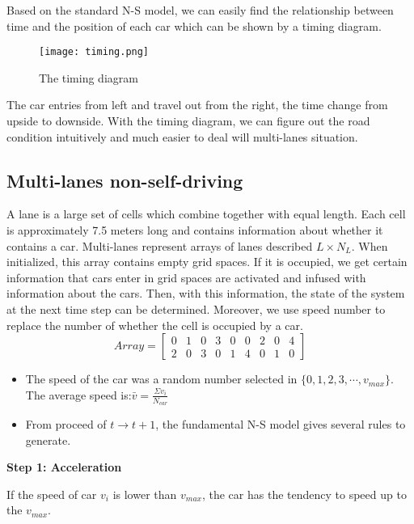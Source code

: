 \documentclass{mcmthesis}
\numberwithin{equation}{section}
\newcommand{\scite}[1]{\textsuperscript{\cite{#1}}}%
\begin{document}
			Based on the standard N-S model, we can easily find the relationship between time and the position of each car which can be shown by a timing diagram.
			\begin{figure}[H]
				\begin{center}
					\texttt{[image: timing.png]}
					\caption{The timing diagram}
				\end{center}
			\end{figure}

			The car entries from left and travel out from the right, the time change from upside to downside. With the timing diagram, we can figure out the road condition intuitively and much easier to deal will multi-lanes situation.
		\subsection{Multi-lanes non-self-driving}
			A lane is a large set of cells which combine together with equal length. Each cell is approximately 7.5 meters long and contains information about whether it contains a car. Multi-lanes represent arrays of lanes described $L \times N_{L}$. When initialized, this array contains empty grid spaces\scite{4}. If it is occupied, we get certain information that cars enter in grid spaces are activated and infused with information about the cars. Then, with this information, the state of the system at the next time step can be determined. Moreover, we use speed number to replace the number of whether the cell is occupied by a car.
			\begin{equation}
				Array=
				\begin{bmatrix}
					0&1&0&3&0&0&2&0&4\\
					2&0&3&0&1&4&0&1&0
				\end{bmatrix}
			\end{equation}
			\begin{itemize}
				\item The speed of the car was a random number selected in $\{0, 1, 2, 3, \cdots, v_{max}\}$.\\

				The average speed is:$\bar{v} = \frac{\Sigma v_{i}}{N_{car}}$
				\item From proceed of $t \rightarrow t+1$, the fundamental N-S model gives several rules to generate.
			\end{itemize}

			\textbf{Step 1: Acceleration}

				If the speed of car $v_{i}$ is lower than $v_{max}$, the car has the tendency to speed up to the $v_{max}$. 
\end{document}
